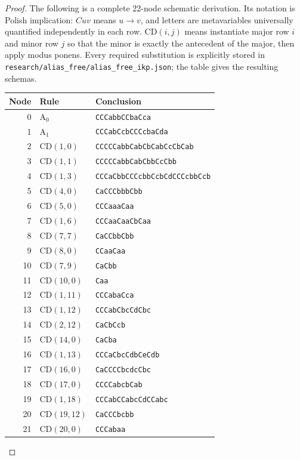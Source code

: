\begin{proof}
The following is a complete 22-node schematic derivation.
Its notation is Polish implication: $Cuv$ means $u\to v$, and letters
are metavariables universally quantified independently in each row.
$\mathrm{CD}(i,j)$ means instantiate major row $i$ and minor row $j$
so that the minor is exactly the antecedent of the major, then apply
modus ponens. Every required substitution is explicitly stored in
\texttt{research/alias\_free/alias\_free\_ikp.json}; the table gives the resulting schemas.

\begin{center}
\small
\begin{tabular}{rll}
Node&Rule&Conclusion\\ \hline
0&$\mathrm{A}_0$&\texttt{CCCabbCCbaCca}\\
1&$\mathrm{A}_1$&\texttt{CCCabCcbCCCcbaCda}\\
2&$\mathrm{CD}(1,0)$&\texttt{CCCCCabbCabCbCabCcCbCab}\\
3&$\mathrm{CD}(1,1)$&\texttt{CCCCCabbCabCbbCcCbb}\\
4&$\mathrm{CD}(1,3)$&\texttt{CCCaCbbCCCcbbCcbCdCCCcbbCcb}\\
5&$\mathrm{CD}(4,0)$&\texttt{CaCCCbbbCbb}\\
6&$\mathrm{CD}(5,0)$&\texttt{CCCaaaCaa}\\
7&$\mathrm{CD}(1,6)$&\texttt{CCCaaCaaCbCaa}\\
8&$\mathrm{CD}(7,7)$&\texttt{CaCCbbCbb}\\
9&$\mathrm{CD}(8,0)$&\texttt{CCaaCaa}\\
10&$\mathrm{CD}(7,9)$&\texttt{CaCbb}\\
11&$\mathrm{CD}(10,0)$&\texttt{Caa}\\
12&$\mathrm{CD}(1,11)$&\texttt{CCCabaCca}\\
13&$\mathrm{CD}(1,12)$&\texttt{CCCabCbcCdCbc}\\
14&$\mathrm{CD}(2,12)$&\texttt{CaCbCcb}\\
15&$\mathrm{CD}(14,0)$&\texttt{CaCba}\\
16&$\mathrm{CD}(1,13)$&\texttt{CCCaCbcCdbCeCdb}\\
17&$\mathrm{CD}(16,0)$&\texttt{CaCCCCbcdcCbc}\\
18&$\mathrm{CD}(17,0)$&\texttt{CCCCabcbCab}\\
19&$\mathrm{CD}(1,18)$&\texttt{CCCabCCabcCdCCabc}\\
20&$\mathrm{CD}(19,12)$&\texttt{CaCCCbcbb}\\
21&$\mathrm{CD}(20,0)$&\texttt{CCCabaa}\\


\end{tabular}
\end{center}
\end{proof}
